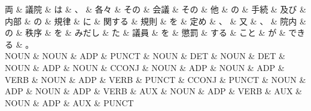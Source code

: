 \documentclass[tikz,border=5pt]{standalone}
\begin{document}
\small
\begin{dependency}[edge unit distance=12.0pt]
    \begin{deptext}[column sep=0.5em]
        両 \& 議院 \& は \& 、 \& 各々 \& その \& 会議 \& その \& 他 \& の \& 手続 \& 及び \& 内部 \& の \& 規律 \& に \& 関する \& 規則 \& を \& 定め \& 、 \& 又 \& 、 \& 院内 \& の \& 秩序 \& を \& みだし \& た \& 議員 \& を \& 懲罰 \& する \& こと \& が \& できる \& 。\\
        NOUN \& NOUN \& ADP \& PUNCT \& NOUN \& DET \& NOUN \& DET \& NOUN \& ADP \& NOUN \& CCONJ \& NOUN \& ADP \& NOUN \& ADP \& VERB \& NOUN \& ADP \& VERB \& PUNCT \& CCONJ \& PUNCT \& NOUN \& ADP \& NOUN \& ADP \& VERB \& AUX \& NOUN \& ADP \& VERB \& AUX \& NOUN \& ADP \& AUX \& PUNCT\\
    \end{deptext}
\end{dependency}
\end{document}
